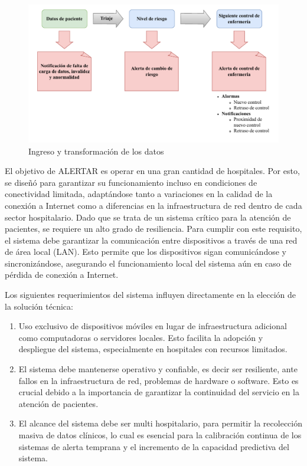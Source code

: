 \begin{figure}
    \centering
    \includegraphics[width=\linewidth]{Imagenes/Intro/TransformacionDatos.pdf}
    \caption{Ingreso y transformación de los datos}
    \label{fig:transformacionDatos}
\end{figure}
El objetivo de ALERTAR es operar en una gran cantidad de hospitales. Por esto, se diseñó para garantizar su funcionamiento incluso en condiciones de conectividad limitada, adaptándose tanto a variaciones en la calidad de la conexión a Internet como a diferencias en la infraestructura de red dentro de cada sector hospitalario. Dado que se trata de un sistema crítico para la atención de pacientes, se requiere un alto grado de resiliencia. Para cumplir con este requisito, el sistema debe garantizar la comunicación entre dispositivos a través de una red de área local (LAN). Esto permite que los dispositivos sigan comunicándose y sincronizándose, asegurando el funcionamiento local del sistema aún en caso de pérdida de conexión a Internet.

Los siguientes requerimientos del sistema influyen directamente en la elección de la solución técnica: 
\begin{enumerate}
    \item Uso exclusivo de dispositivos móviles en lugar de infraestructura adicional como computadoras o servidores locales. Esto facilita la adopción y despliegue del sistema, especialmente en hospitales con recursos limitados.
    \item El sistema debe mantenerse operativo y confiable, es decir ser resiliente, ante fallos en la infraestructura de red, problemas de hardware o software. Esto es crucial debido a la importancia de garantizar la continuidad del servicio en la atención de pacientes.
    \item El alcance del sistema debe ser multi hospitalario, para permitir la recolección masiva de datos clínicos, lo cual es esencial para la calibración continua de los sistemas de alerta temprana y el incremento de la capacidad predictiva del sistema.
\end{enumerate}

